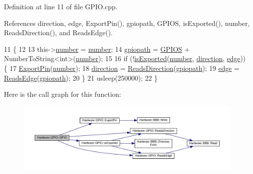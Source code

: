 Definition at line 11 of file G\+P\+I\+O.\+cpp.



References direction, edge, Export\+Pin(), gpiopath, G\+P\+I\+O\+S, is\+Exported(), number, Reads\+Direction(), and Reads\+Edge().


\begin{DoxyCode}
11                      \{
12 
13   this->\hyperlink{class_hardware_1_1_g_p_i_o_a1671a87bb70911b0a6a29019a068cf96}{number} = \hyperlink{class_hardware_1_1_g_p_i_o_a1671a87bb70911b0a6a29019a068cf96}{number};
14   \hyperlink{class_hardware_1_1_g_p_i_o_ac47062ed6aba52b9e8506e1575bf5061}{gpiopath} = \hyperlink{_g_p_i_o_8h_ad3c9654be00e07ca084884963ae36830}{GPIOS} + NumberToString<int>(\hyperlink{class_hardware_1_1_g_p_i_o_a1671a87bb70911b0a6a29019a068cf96}{number});
15 
16   \textcolor{keywordflow}{if} (!\hyperlink{class_hardware_1_1_g_p_i_o_a423f9ac92259cacdca0c82c3ee9b1cdd}{isExported}(\hyperlink{class_hardware_1_1_g_p_i_o_a1671a87bb70911b0a6a29019a068cf96}{number}, \hyperlink{class_hardware_1_1_g_p_i_o_a77e93e4f6650507fdc4898d272d540e7}{direction}, \hyperlink{class_hardware_1_1_g_p_i_o_adf15f74f053069029e99934e28c109e0}{edge})) \{
17     \hyperlink{class_hardware_1_1_g_p_i_o_a1a880bee633c9c5227cb36d2d6c63a52}{ExportPin}(\hyperlink{class_hardware_1_1_g_p_i_o_a1671a87bb70911b0a6a29019a068cf96}{number});
18     \hyperlink{class_hardware_1_1_g_p_i_o_a77e93e4f6650507fdc4898d272d540e7}{direction} = \hyperlink{class_hardware_1_1_g_p_i_o_a875d4f95ff3e6a70196660faa0477cf5}{ReadsDirection}(\hyperlink{class_hardware_1_1_g_p_i_o_ac47062ed6aba52b9e8506e1575bf5061}{gpiopath});
19     \hyperlink{class_hardware_1_1_g_p_i_o_adf15f74f053069029e99934e28c109e0}{edge} = \hyperlink{class_hardware_1_1_g_p_i_o_ac5a3c6d1a0ce58a0b2ee0752623810e4}{ReadsEdge}(\hyperlink{class_hardware_1_1_g_p_i_o_ac47062ed6aba52b9e8506e1575bf5061}{gpiopath});
20   \}
21   usleep(250000);
22 \}
\end{DoxyCode}


Here is the call graph for this function\+:\nopagebreak
\begin{figure}[H]
\begin{center}
\leavevmode
\includegraphics[width=350pt]{class_hardware_1_1_g_p_i_o_afa29c38f1b07c2db68572ac0c60ed787_cgraph}
\end{center}
\end{figure}


